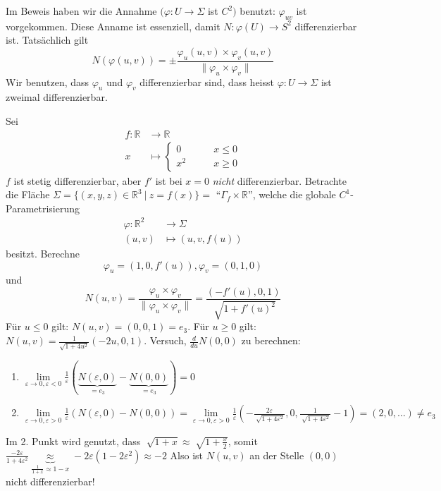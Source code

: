 \documentclass[../main.tex]{subfiles}
\begin{document}
\begin{remark}
    Im Beweis haben wir die Annahme $(\varphi: U \to \Sigma$ ist $C^{2})$ benutzt: $\varphi_{uv}$ ist vorgekommen. 
    Diese Anname ist essenziell, damit $N:\varphi(U) \to S^{2}$ differenzierbar ist. Tatsächlich gilt $$N(\varphi(u,v)) = \pm \frac{\varphi_{u}(u,v)\times\varphi_{v}(u,v)}{\|\varphi_u \times \varphi_{v}\|}$$
    Wir benutzen, dass $\varphi_{u}$ und $\varphi_{v}$ differenzierbar sind, dass heisst $\varphi : U \to \Sigma$ ist zweimal differenzierbar.
\end{remark}

\begin{example}
    Sei
    \begin{align*}
        f:\mathbb{R} &\to \mathbb{R}\\
        x &\mapsto
        \begin{cases}
            0  \qquad &x\le 0 \\
            x^{2} \qquad &x\ge 0
        \end{cases}
    \end{align*}
    $f$ ist stetig differenzierbar, aber $f'$ ist bei $x=0$ \emph{nicht} differenzierbar.
    Betrachte die Fläche $\Sigma = \{(x,y,z)\in \mathbb{R}^{3} \ | \ z = f(x)\}=$ ``$\Gamma_f\times \mathbb{R}$'', welche die globale $C^{1}$-Parametrisierung 
    \begin{align*}
        \varphi : \mathbb{R}^{2} &\to \Sigma\\
        (u,v) &\mapsto (u,v,f(u)) 
    \end{align*} besitzt.
    Berechne $$\varphi_{u} = (1, 0, f'(u)), \varphi_{v} = (0,1,0)$$ und $$N(u,v) = \frac{\varphi_{u} \times \varphi_{v}}{\lVert \varphi_{u} \times \varphi_{v} \rVert} = \frac{(-f'(u),0,1)}{\sqrt[]{1 + f'(u)^{2}}}$$
    Für \emph{$u \leq 0$} gilt: $N(u,v) = (0,0,1) = e_{3} $. Für \emph{$u \geq 0$} gilt: $N(u,v) = \frac{1}{\sqrt{1 + 4u^{2}}}(-2u,0,1)$. \newline
    Versuch, $\frac{d}{du}N(0,0)$ zu berechnen:
    \begin{enumerate}
        \item $\lim\limits_{\varepsilon \rightarrow 0, \varepsilon < 0}{\frac{1}{\varepsilon}(\underbrace{N(\varepsilon,0)}_{= e_{3}} - \underbrace{N(0,0)}_{= e_{3}}) = 0}$
        \item $\lim\limits_{\varepsilon \rightarrow 0, \varepsilon > 0}{\frac{1}{\varepsilon}(N(\varepsilon,0) - N(0,0))} = \lim\limits_{\varepsilon \rightarrow 0, \varepsilon > 0}{\frac{1}{\varepsilon}(-\frac{2\varepsilon}{\sqrt[]{1+4\varepsilon^{2}}},0,\frac{1}{\sqrt[]{1+4\varepsilon^{2}}}-1)} = (2, 0, \dots) \neq e_{3}$
    \end{enumerate}
    Im 2. Punkt wird genutzt, dass $\sqrt[]{1+x} \approx \sqrt[]{1+\frac{x}{2}}$, somit $\frac{-2\varepsilon}{1+4\varepsilon^{2}} \underbrace{\approx}_{\frac{1}{1+x} \approx 1-x} -2\varepsilon(1-2\varepsilon^{2}) \approx -2$
    Also ist $N(u,v)$ an der Stelle $(0,0)$ nicht differenzierbar!
\end{example}
\end{document}
